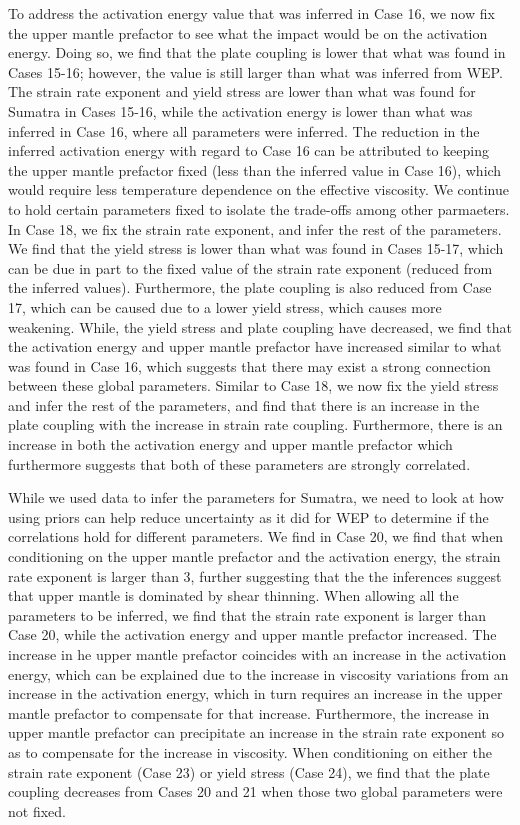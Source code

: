 \documentclass[12pt]{article}
\begin{document}
{To address the activation energy value that was inferred in Case 16, we now fix the upper mantle prefactor to see what the impact would be on the activation energy. Doing so, we find that the plate coupling is lower that what was found in Cases 15-16; however, the value is still larger than what was inferred from WEP. The strain rate exponent and yield stress are lower than what was found for Sumatra in Cases 15-16, while the activation energy is lower than what was inferred in Case 16, where all parameters were inferred. The reduction in the inferred activation energy with regard to Case 16 can be attributed to keeping the upper mantle prefactor fixed (less than the inferred value in Case 16), which would require less temperature dependence on the effective viscosity. We continue to hold certain parameters fixed to isolate the trade-offs among other parmaeters. In Case 18, we fix the strain rate exponent, and infer the rest of the parameters. We find that the yield stress is lower than what was found in Cases 15-17, which can be due in part to the fixed value of the strain rate exponent (reduced from the inferred values). Furthermore, the plate coupling is also reduced from Case 17, which can be caused due to a lower yield stress, which causes more weakening. While, the yield stress and plate coupling have decreased, we find that the activation energy and upper mantle prefactor have increased similar to what was found in Case 16, which suggests that there may exist a strong connection between these global parameters. Similar to Case 18, we now fix the yield stress and infer the rest of the parameters, and find that there is an increase in the plate coupling with the increase in strain rate coupling. Furthermore, there is an increase in both the activation energy and upper mantle prefactor which furthermore suggests that both of these parameters are strongly correlated.  

While we used data to infer the parameters for Sumatra, we need to look at how using priors can help reduce uncertainty as it did for WEP to determine if the correlations hold for different parameters. We find in Case 20, we find that when conditioning on the upper mantle prefactor and the activation energy, the strain rate exponent is larger than 3, further suggesting that the the inferences suggest that upper mantle is dominated by shear thinning. When allowing all the parameters to be inferred, we find that the strain rate exponent is larger than Case 20, while the activation energy and upper mantle prefactor increased. The increase in he upper mantle prefactor coincides with an increase in the activation energy, which can be explained due to the increase in viscosity variations from an increase in the activation energy, which in turn requires an increase in the upper mantle prefactor to compensate for that increase. Furthermore, the increase in upper mantle prefactor can precipitate an increase in the strain rate exponent so as to compensate for the increase in viscosity. When conditioning on either the strain rate exponent (Case 23) or yield stress (Case 24), we find that the plate coupling decreases from Cases 20 and 21 when those two global parameters were not fixed.

}
\end{document}
